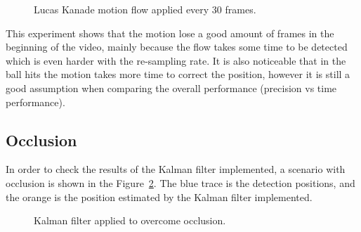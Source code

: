 \documentclass[10pt,twocolumn,letterpaper]{article}
\begin{document}
\begin{figure}[!h]
\centering
\setlength{\fboxsep}{1pt}
\setlength{\fboxrule}{1pt}
\caption{Lucas Kanade motion flow applied every 30 frames.}\label{fig:motion_30}
\end{figure}

This experiment shows that the motion lose a good amount of frames in the beginning of the video, mainly because the flow takes some time to be detected which is even harder with the re-sampling rate. It is also noticeable that in the ball hits the motion takes more time to correct the position, however it is still a good assumption when comparing the overall performance (precision vs time performance).

\subsection{Occlusion}

In order to check the results of the Kalman filter implemented, a scenario with occlusion is shown in the Figure~\ref{fig:occlusion}. The blue trace is the detection positions, and the orange is the position estimated by the Kalman filter implemented.

\begin{figure}[!h]
\centering
\setlength{\fboxsep}{1pt}
\setlength{\fboxrule}{1pt}
\caption{Kalman filter applied to overcome occlusion.}\label{fig:occlusion}
\end{figure}
\end{document}
